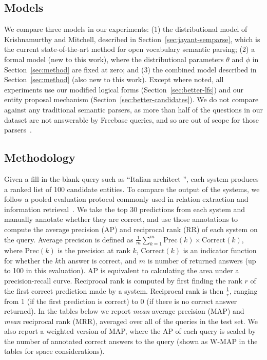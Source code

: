 \documentclass[11pt,letterpaper]{article}
\newcommand{\secref}[1]{Section~\ref{sec:#1}}
\newcommand{\blank}{\underline{\hspace{.5cm}}}
\begin{document}
\subsection{Models}

We compare three models in our experiments: (1) the distributional model of Krishnamurthy and
Mitchell, described in \secref{jayant-semparse}, which is the current state-of-the-art method for
open vocabulary semantic parsing; (2) a formal model (new to this work), where the distributional
parameters $\theta$ and $\phi$ in \secref{method} are fixed at zero; and (3) the combined model
described in \secref{method} (also new to this work).  Except where noted, all experiments use our
modified logical forms (\secref{better-lfs}) and our entity proposal mechanism
(\secref{better-candidates}).  We do not compare against any traditional semantic parsers, as more
than half of the questions in our dataset are not answerable by Freebase queries, and so are out of
scope for those parsers~\cite{krishnamurthy-2015-semparse-open-vocabulary}.

\subsection{Methodology}

Given a fill-in-the-blank query such as ``Italian architect \blank{}'', each system produces a
ranked list of 100 candidate entities.  To compare the output of the systems, we follow a pooled
evaluation protocol commonly used in relation extraction and information
retrieval~\cite{west-2014-kbc-via-qa,riedel-2013-mf-universal-schema}.  We take the top 30
predictions from each system and manually annotate whether they are correct, and use those
annotations to compute the average precision (AP) and reciprocal rank (RR) of each system on the
query.  Average precision is defined as $\frac{1}{m}\sum^m_{k=1} \mathrm{Prec}(k) \times
\mathrm{Correct}(k)$, where $\mathrm{Prec}(k)$ is the precision at rank $k$, $\mathrm{Correct}(k)$
is an indicator function for whether the $k$th answer is correct, and $m$ is number of returned
answers (up to 100 in this evaluation).  AP is equivalent to calculating the area under a
precision-recall curve.  Reciprocal rank is computed by first finding the rank $r$ of the first
correct prediction made by a system.  Reciprocal rank is then $\frac{1}{r}$, ranging from 1 (if the
first prediction is correct) to 0 (if there is no correct answer returned).  In the tables below we
report \emph{mean} average precision (MAP) and \emph{mean} reciprocal rank (MRR), averaged over all
of the queries in the test set.  We also report a weighted version of MAP, where the AP of each
query is scaled by the number of annotated correct answers to the query (shown as W-MAP in the
tables for space considerations).
\end{document}
